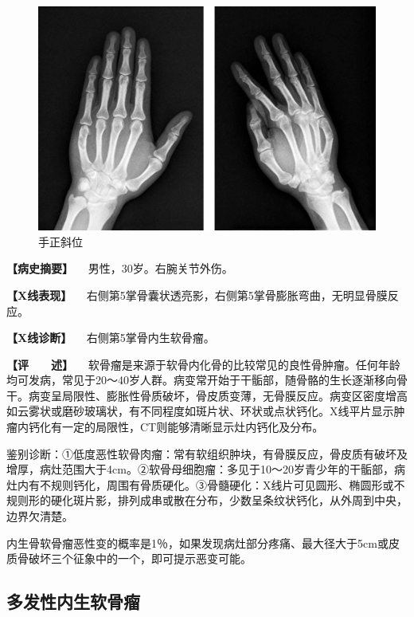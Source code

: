 \begin{figure}[!htbp]
 \centering
 \includegraphics{./images/Image00089.jpg}
 \captionsetup{justification=centering}
 \caption{手正斜位}
 \label{fig2-7-4}
  \end{figure} 

\textbf{【病史摘要】} 　男性，30岁。右腕关节外伤。

\textbf{【X线表现】}
　右侧第5掌骨囊状透亮影，右侧第5掌骨膨胀弯曲，无明显骨膜反应。

\textbf{【X线诊断】} 　右侧第5掌骨内生软骨瘤。

\textbf{【评　　述】}
　软骨瘤是来源于软骨内化骨的比较常见的良性骨肿瘤。任何年龄均可发病，常见于20～40岁人群。病变常开始于干骺部，随骨骼的生长逐渐移向骨干。病变呈局限性、膨胀性骨质破坏，骨皮质变薄，无骨膜反应。病变区密度增高如云雾状或磨砂玻璃状，有不同程度如斑片状、环状或点状钙化。X线平片显示肿瘤内钙化有一定的局限性，CT则能够清晰显示灶内钙化及分布。

鉴别诊断：①低度恶性软骨肉瘤：常有软组织肿块，有骨膜反应，骨皮质有破坏及增厚，病灶范围大于4cm。②软骨母细胞瘤：多见于10～20岁青少年的干骺部，病灶内有不规则钙化，周围有骨质硬化。③骨髓硬化：X线片可见圆形、椭圆形或不规则形的硬化斑片影，排列成串或散在分布，少数呈条纹状钙化，从外周到中央，边界欠清楚。

内生骨软骨瘤恶性变的概率是1％，如果发现病灶部分疼痛、最大径大于5cm或皮质骨破坏三个征象中的一个，即可提示恶变可能。

\subsection{多发性内生软骨瘤}

